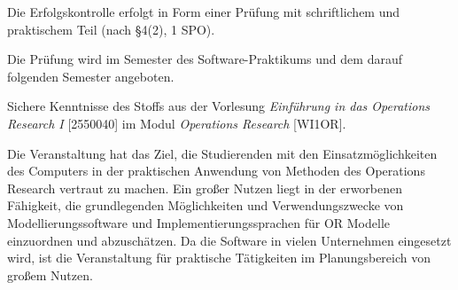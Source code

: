 \begin{course}

\setdoclanguagegerman
{}



\coursehead


\label{cour_7845.dp_997}


\begin{styleenv}
\begin{assessment}
Die Erfolgskontrolle erfolgt in Form einer Prüfung mit schriftlichem und praktischem Teil (nach §4(2), 1 SPO).

 

Die Prüfung wird im Semester des Software-Praktikums und dem darauf folgenden Semester angeboten.


\end{assessment}

\begin{conditions}Sichere Kenntnisse des Stoffs aus der Vorlesung \emph{Einführung in das Operations Research I} [2550040] im Modul \emph{Operations Research} [WI1OR].

\end{conditions}


\end{styleenv}

\begin{learningoutcomes}
Die Veranstaltung hat das Ziel, die Studierenden mit den Einsatzmöglichkeiten des Computers in der praktischen Anwendung von Methoden des Operations Research vertraut zu machen. Ein großer Nutzen liegt in der erworbenen Fähigkeit, die grundlegenden Möglichkeiten und Verwendungszwecke von Modellierungssoftware und Implementierungssprachen für OR Modelle einzuordnen und abzuschätzen. Da die Software in vielen Unternehmen eingesetzt wird, ist die Veranstaltung für praktische Tätigkeiten im Planungsbereich von großem Nutzen.



\end{learningoutcomes}
\end{course}
